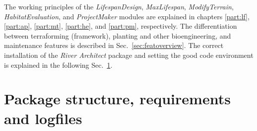 The working principles of the \textit{LifespanDesign}, \textit{MaxLifespan}, \textit{ModifyTerrain}, \textit{HabitatEvaluation}, and \textit{ProjectMaker} modules are explained in chapters \ref{part:lf}, \ref{part:ap}, \ref{part:mt}, \ref{part:he}, and \ref{part:pm}, respectively. The differentiation between terraforming (framework), planting and other bioengineering, and maintenance features is described in Sec.~\ref{sec:featoverview}. The correct installation of the \textit{River Architect} package and setting the good code environment is explained in the following Sec.~\ref{sec:req}.

\section{Package structure, requirements and logfiles} \label{sec:req}
